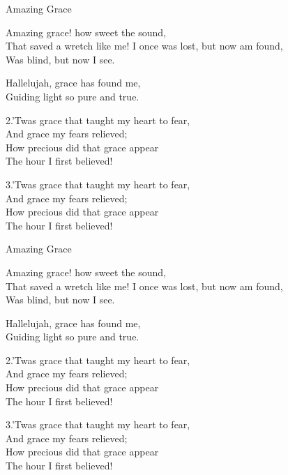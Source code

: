 \documentclass[12pt]{article}
\begin{document}
\HymnBreak

\begin{hymn}{4}{Amazing Grace}

\begin{stanza}
Amazing grace! how sweet the sound,\\
That saved a wretch like me!
I once was lost, but now am found,\\
Was blind, but now I see.
\end{stanza}

\begin{chorus}
Hallelujah, grace has found me,\\
Guiding light so pure and true.
\end{chorus}

\begin{stanza}
2.’Twas grace that taught my heart to fear,\\
And grace my fears relieved;\\
How precious did that grace appear\\
The hour I first believed!
\end{stanza}

\begin{stanza}
3.’Twas grace that taught my heart to fear,\\
And grace my fears relieved;\\
How precious did that grace appear\\
The hour I first believed!
\end{stanza}
\end{hymn}

\HymnBreak

\begin{hymn}{5}{Amazing Grace}

\begin{stanza}
Amazing grace! how sweet the sound,\\
That saved a wretch like me!
I once was lost, but now am found,\\
Was blind, but now I see.
\end{stanza}

\begin{chorus}
Hallelujah, grace has found me,\\
Guiding light so pure and true.
\end{chorus}

\begin{stanza}
2.’Twas grace that taught my heart to fear,\\
And grace my fears relieved;\\
How precious did that grace appear\\
The hour I first believed!
\end{stanza}

\begin{stanza}
3.’Twas grace that taught my heart to fear,\\
And grace my fears relieved;\\
How precious did that grace appear\\
The hour I first believed!
\end{stanza}
\end{hymn}

\newpage
\tableofcontents
\end{document}
